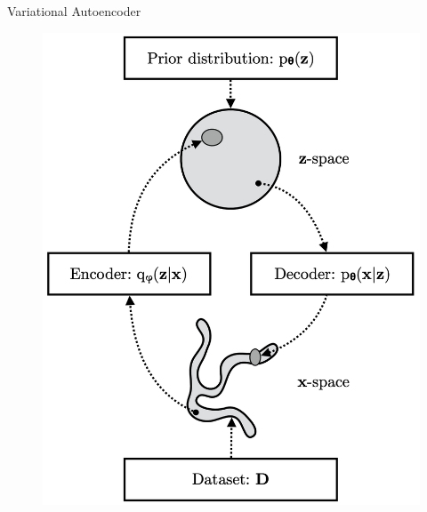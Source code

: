 \documentclass{beamer}
\begin{document}
\begin{frame}{Variational Autoencoder}
\begin{minipage}[t]{0.4\columnwidth}
\begin{figure}[h]
			\includegraphics[width=\linewidth]{figs/vae_scheme}
		\end{figure}
	\end{minipage}
\end{frame}
\end{document}

